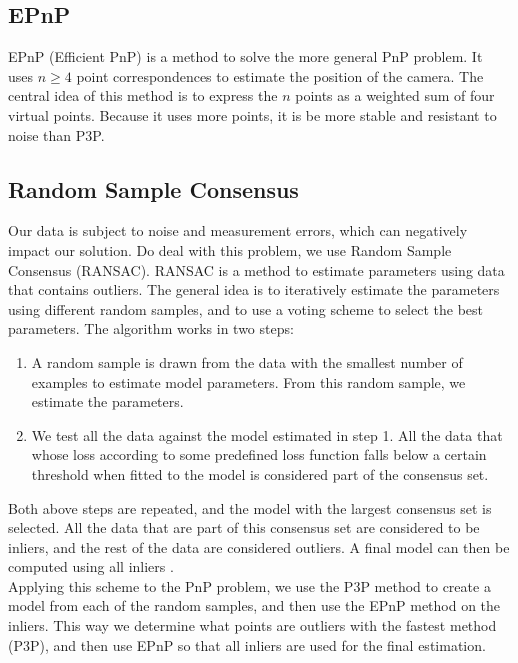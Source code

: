 \subsection{EPnP}
EPnP (Efficient PnP) \cite{epnp} is a method to solve the more general PnP problem. It uses $n \geq 4$ point correspondences to estimate the position of the camera. The central idea of this method is to express the $n$ points as a weighted sum of four virtual points. Because it uses more points, it is be more stable and resistant to noise than P3P.

\subsection{Random Sample Consensus}
Our data is subject to noise and measurement errors, which can negatively impact our solution. Do deal with this problem, we use Random Sample Consensus (RANSAC). RANSAC is a method to estimate parameters using data that contains outliers. The general idea is to iteratively estimate the parameters using different random samples, and to use a voting scheme to select the best parameters. The algorithm works in two steps:
\begin{enumerate}
  \item A random sample is drawn from the data with the smallest number of examples to estimate model parameters. From this random sample, we estimate the parameters.
  \item We test all the data against the model estimated in step 1. All the data that whose loss according to some predefined loss function falls below a certain threshold when fitted to the model is considered part of the consensus set.
\end{enumerate}
Both above steps are repeated, and the model with the largest consensus set is selected. All the data that are part of this consensus set are considered to be inliers, and the rest of the data are considered outliers. A final model can then be computed using all inliers \cite{ransac}.\\
Applying this scheme to the PnP problem, we use the P3P method to create a model from each of the random samples, and then use the EPnP method on the inliers. This way we determine what points are outliers with the fastest method (P3P), and then use EPnP so that all inliers are used for the final estimation.

